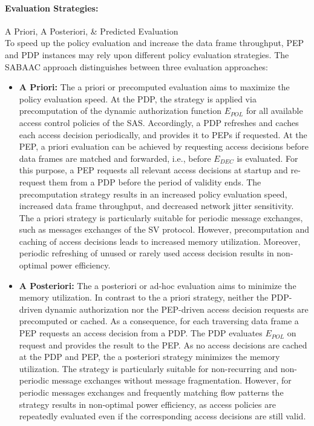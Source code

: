 \paragraph{Evaluation Strategies:} A Priori, A Posteriori, \& Predicted Evaluation\\
To speed up the policy evaluation and increase the data frame throughput, PEP and PDP instances may rely upon different policy evaluation strategies.
The SABAAC approach distinguishes between three evaluation approaches:
\begin{itemize}
    \item \textbf{A Priori:} The a priori or precomputed evaluation aims to maximize the policy evaluation speed.
    At the PDP, the strategy is applied via precomputation of the dynamic authorization function $E_{POL}$ for all available access control policies of the SAS.
    Accordingly, a PDP refreshes and caches each access decision periodically, and provides it to PEPs if requested.
    At the PEP, a priori evaluation can be achieved by requesting access decisions before data frames are matched and forwarded, i.e., before $E_{DEC}$ is evaluated.
    For this purpose, a PEP requests all relevant access decisions at startup and re-request them from a PDP before the period of validity ends.
    The precomputation strategy results in an increased policy evaluation speed, increased data frame throughput, and decreased network jitter sensitivity.
    The a priori strategy is particularly suitable for periodic message exchanges, such as messages exchanges of the SV protocol.
    However, precomputation and caching of access decisions leads to increased memory utilization.
    Moreover, periodic refreshing of unused or rarely used access decision results in non-optimal power efficiency.
    
    \item \textbf{A Posteriori:} The a posteriori or ad-hoc evaluation aims to minimize the memory utilization.
    In contrast to the a priori strategy, neither the PDP-driven dynamic authorization nor the PEP-driven access decision requests are precomputed or cached.
    As a consequence, for each traversing data frame a PEP requests an access decision from a PDP.
    The PDP evaluates $E_{POL}$ on request and provides the result to the PEP.
    As no access decisions are cached at the PDP and PEP, the a posteriori strategy minimizes the memory utilization.
    The strategy is particularly suitable for non-recurring and non-periodic message exchanges without message fragmentation.
    However, for periodic messages exchanges and frequently matching flow patterns the strategy results in non-optimal power efficiency, as access policies are repeatedly evaluated even if the corresponding access decisions are still valid.


\end{itemize}
